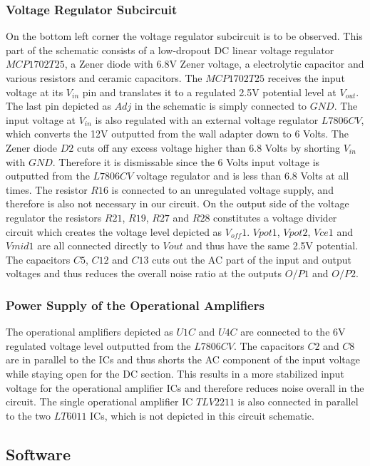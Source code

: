 \subsubsection{Voltage Regulator Subcircuit}
On the bottom left corner the voltage regulator subcircuit is to be observed. This part of the schematic consists of a low-dropout DC linear voltage regulator $MCP1702T25$, a Zener diode with 6.8V Zener voltage, a electrolytic capacitor and various resistors and ceramic capacitors. The $MCP1702T25$ receives the input voltage at its $V_{in}$ pin and translates it to a regulated 2.5V potential level at $V_{out}$. The last pin depicted as $Adj$ in the schematic is simply connected to $GND$. The input voltage at $V_{in}$ is also regulated with an external voltage regulator $L7806CV$, which converts the 12V outputted from the wall adapter down to 6 Volts. The Zener diode $D2$ cuts off any excess voltage higher than 6.8 Volts by shorting $V_{in}$ with $GND$. Therefore it is dismissable since the 6 Volts input voltage is outputted from the $L7806CV$ voltage regulator and is less than 6.8 Volts at all times. The resistor $R16$ is connected to an unregulated voltage supply, and therefore is also not necessary in our circuit. On the output side of the voltage regulator the resistors $R21$, $R19$, $R27$ and $R28$ constitutes a voltage divider circuit which creates the voltage level depicted as $V_{off}1$. $V{pot}1$, $V{pot}2$, $V{ce}1$ and $V{mid}1$ are all connected directly to $V{out}$ and thus have the same 2.5V potential. The capacitors $C5$, $C12$ and $C13$ cuts out the AC part of the input and output voltages and thus reduces the overall noise ratio at the outputs $O/P1$ and $O/P2$.

\subsubsection{Power Supply of the Operational Amplifiers}

The operational amplifiers depicted as $U1C$ and $U4C$ are connected to the 6V regulated voltage level outputted from the $L7806CV$. The capacitors $C2$ and $C8$ are in parallel to the ICs and thus shorts the AC component of the input voltage while staying open for the DC section. This results in a more stabilized input voltage for the operational amplifier ICs and therefore reduces noise overall in the circuit. The single operational amplifier IC $TLV2211$ is also connected in parallel to the two $LT6011$ ICs, which is not depicted in this circuit schematic.

\subsection{Software}


   
   
   
   

